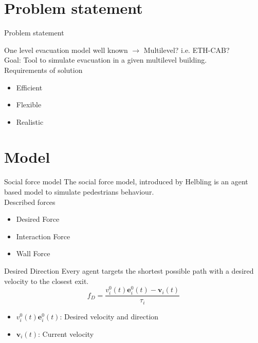 \section{Problem statement}

\begin{frame}{Problem statement}

One level evacuation model well known $\rightarrow$  Multilevel? i.e. ETH-CAB?\\
Goal: Tool to simulate evacuation in a given multilevel building.\\
Requirements of solution
\begin{itemize}
\item Efficient
\item Flexible
\item Realistic
\end{itemize}

\end{frame}


\section{Model}

\begin{frame}{Social force model}
The social force model, introduced by Helbling is an agent based model to simulate pedestrians behaviour.\\
Described forces
\begin{itemize}
\item Desired Force
\item Interaction Force
\item Wall Force
\end{itemize}
\end{frame}

\begin{frame}{Desired Direction}
Every agent targets the shortest possible path with a desired velocity to the closest exit.
\begin{equation*}
f_{D}=\frac{v_{i}^{0}(t)\mathbf{e}_{i}^{0}(t)-\mathbf{v}_{i}(t)}{\tau_{i}}
\end{equation*}
\begin{itemize}
\item $v_{i}^{0}(t)\mathbf{e}_{i}^{0}(t)$: Desired velocity and direction
\item $\mathbf{v}_{i}(t)$: Current velocity
\end{itemize}
\end{frame}

